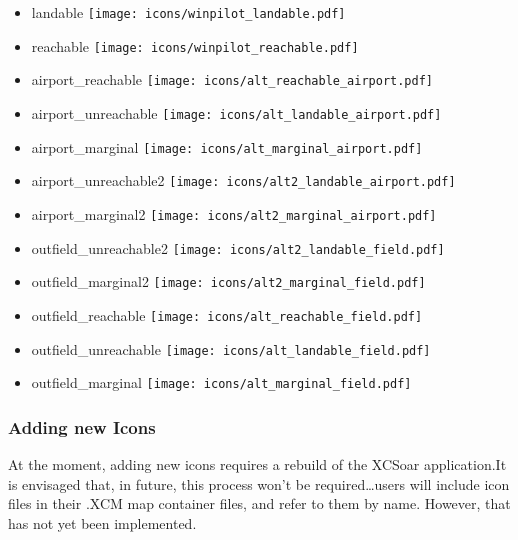 \begin{itemize}
\item landable \texttt{[image: icons/winpilot\_landable.pdf]}
\item reachable \texttt{[image: icons/winpilot\_reachable.pdf]}
\item airport\_reachable \texttt{[image: icons/alt\_reachable\_airport.pdf]}
\item airport\_unreachable \texttt{[image: icons/alt\_landable\_airport.pdf]}
\item airport\_marginal \texttt{[image: icons/alt\_marginal\_airport.pdf]}
\item airport\_unreachable2 \texttt{[image: icons/alt2\_landable\_airport.pdf]}
\item airport\_marginal2 \texttt{[image: icons/alt2\_marginal\_airport.pdf]}
\item outfield\_unreachable2 \texttt{[image: icons/alt2\_landable\_field.pdf]}
\item outfield\_marginal2 \texttt{[image: icons/alt2\_marginal\_field.pdf]}
\item outfield\_reachable \texttt{[image: icons/alt\_reachable\_field.pdf]}
\item outfield\_unreachable \texttt{[image: icons/alt\_landable\_field.pdf]}
\item outfield\_marginal \texttt{[image: icons/alt\_marginal\_field.pdf]}
\end{itemize}
\subsubsection{Adding new Icons}
At the moment, adding new icons requires a rebuild of the XCSoar application.It is envisaged that, in future, 
this process won't be required\dots users will include icon files in their .XCM map container files, and refer to them
by name. However, that has not yet been implemented. 

